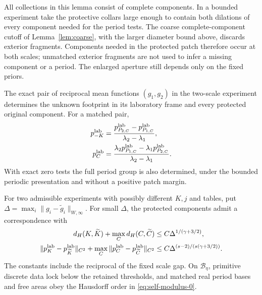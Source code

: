 All collections in this lemma consist of complete components. In a
bounded experiment take the protective collars large enough to contain
both dilations of every component needed for the period tests. The
coarse complete-component cutoff of Lemma~\ref{lem:coarse}, with the
larger diameter bound above, discards exterior fragments. Components
needed in the protected patch therefore occur at both scales; unmatched
exterior fragments are not used to infer a missing component or a period.
The enlarged aperture still depends only on the fixed priors.

\begin{theorem}
\label{thm:self-exact}
The exact pair of reciprocal mean functions $(g_1,g_2)$ in the
two-scale experiment determines the unknown footprint in its laboratory
frame and every protected original component. For a matched pair,
\begin{align}
 p_{-K}^{\rm lab}
   &=\frac{p_{P_{2,C}}^{\rm lab}-p_{P_{1,C}}^{\rm lab}}
                   {\lambda_2-\lambda_1},\label{eq:self-footprint}\\
 p_C^{\rm lab}
   &=\frac{\lambda_2p_{P_{1,C}}^{\rm lab}
                  -\lambda_1p_{P_{2,C}}^{\rm lab}}
                   {\lambda_2-\lambda_1}.\label{eq:self-body}
\end{align}
With exact zero tests the full period group is also determined, under
the bounded periodic presentation and without a positive patch margin.

For two admissible experiments with possibly different $K,j$ and tables,
put $\Delta=\max_i\|g_i-\widetilde g_i\|_{W,\infty}$.
For small $\Delta$, the protected components admit a correspondence with
\begin{align}
 d_H(K,\widetilde K)+\max_Cd_H(C,\widetilde C)
       &\le C\Delta^{1/(\gamma+3/2)},\label{eq:self-modulus-0}\\
 \|p_K^{\rm lab}-p_{\widetilde K}^{\rm lab}\|_{C^2}
  +\max_C\|p_C^{\rm lab}-p_{\widetilde C}^{\rm lab}\|_{C^2}
       &\le C\Delta^{(s-2)/(s(\gamma+3/2))}.
                                                   \label{eq:self-modulus-2}
\end{align}
The constants include the reciprocal of the fixed scale gap. On
$\mathcal B_\eta$, primitive discrete data lock below the retained
thresholds, and matched real period bases and free areas obey the
Hausdorff order in \eqref{eq:self-modulus-0}.
\end{theorem}
